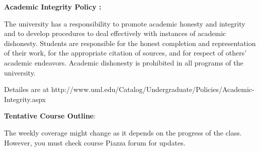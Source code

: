 \documentclass[11pt]{article}
\begin{document}
\textbf {\large Academic Integrity Policy :} 

The university has a responsibility to promote academic honesty and integrity and to develop procedures to deal effectively with instances of academic dishonesty. Students are responsible for the honest completion and representation of their work, for the appropriate citation of sources, and for respect of others’ academic endeavors. Academic dishonesty is prohibited in all programs of the university.

Detailes are at http://www.uml.edu/Catalog/Undergraduate/Policies/Academic-Integrity.aspx


\newpage

\textbf {\large Tentative Course Outline}:

The weekly coverage might change as it depends on the progress of the class.  However, you must check course Piazza forum for updates.
\end{document}
